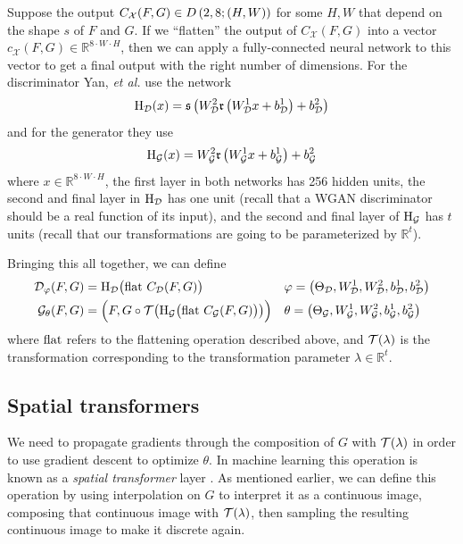 \documentclass{article}
\newcommand{\R}{\mathbb{R}}
\begin{document}
	Suppose the output \(C_\mathcal{X}(F, G) \in {D\left(2, 8; (H, W)\right)}\) for some \(H, W\) that depend on the shape \(s\) of \(F\) and \(G\). If we ``flatten'' the output of \(C_\mathcal{X}(F,G)\) into a vector \(c_\mathcal{X}(F,G) \in \R^{8\cdot W\cdot H}\), then we can apply a fully-connected neural network to this vector to get a final output with the right number of dimensions. For the discriminator Yan, \textit{et al.} use the network
	\newcommand{\FC}{\mathrm{H}}
	\begin{equation}\label{eq:FC_disc}
		\FC_\discriminator(x) = \sigmoid\left(W_\discriminator^2\relu \left(W_\discriminator^1x + b_\discriminator^1\right) + b_\discriminator^2\right)
	\end{equation}
	and for the generator they use
	\begin{equation}\label{eq:FC_gen}
		\FC_\generator(x) = W_\generator^2\relu \left(W_\generator^1x + b_\generator^1\right) + b_\generator^2
	\end{equation}
	where \(x \in \R^{8\cdot W \cdot H}\), the first layer in both networks has 256 hidden units, the second and final layer in \(\FC_\discriminator\) has one unit (recall that a WGAN discriminator should be a real function of its input), and the second and final layer of \(\FC_\generator\) has \(t\) units (recall that our transformations are going to be parameterized by \(\R^t\)).
	
	Bringing this all together, we can define
	\newcommand{\flatten}{\textnormal{flat }}
	\begin{align}
		\discriminator_\varphi(F, G) &= \FC_\discriminator\big(\flatten C_\discriminator(F, G)\big) &&\varphi = \left(\Theta_\discriminator, W_\discriminator^1, W_\discriminator^2, b_\discriminator^1, b_\discriminator^2\right)\\
		\generator_\theta(F, G) &= \Big(F, G \circ \mathcal{T}\big(\FC_\generator\big(\flatten C_\generator(F, G)\big)\big)\Big) &&\theta = \left(\Theta_\generator, W_\generator^1, W_\generator^2, b_\generator^1, b_\generator^2\right)
	\end{align}
	where \(\flatten\)refers to the flattening operation described above, and \(\mathcal{T}(\lambda)\) is the transformation corresponding to the transformation parameter \(\lambda \in \R^t\).	

	\subsection{Spatial transformers}\label{sec:spatialtransformer}
	We need to propagate gradients through the composition of \(G\) with \(\mathcal{T}(\lambda)\) in order to use gradient descent to optimize \(\theta\). In machine learning this operation is known as a \textit{spatial transformer} layer \cite{SpatialTransformerNetworks}. As mentioned earlier, we can define this operation by using interpolation on \(G\) to interpret it as a continuous image, composing that continuous image with \(\mathcal{T}(\lambda)\), then sampling the resulting continuous image to make it discrete again.
	
\end{document}
